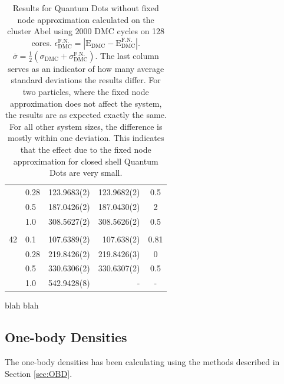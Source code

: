 \begin{table}
\begin{center}
\begin{tabular}{rl|rrc}
          &   0.28   & 123.9683(2) & 123.9682(2)& 0.5 \\
          &   0.5    & 187.0426(2) & 187.0430(2)& 2 \\
          &   1.0    & 308.5627(2) & 308.5626(2)& 0.5 \\
\cline{2-5}
\multicolumn{5}{c}{} \\
    42    &   0.1    & 107.6389(2) & 107.638(2) & 0.81 \\
          &   0.28   & 219.8426(2) & 219.8426(3)& 0 \\
          &   0.5    & 330.6306(2) & 330.6307(2)& 0.5 \\
          &   1.0    & 542.9428(8) &    -       & - \\
\hline\hline
\end{tabular}
\caption{Results for Quantum Dots without fixed node approximation calculated on the cluster Abel using $2000$ DMC cycles on 128 cores. $\epsilon_\mathrm{DMC}^\mathrm{F.N.} = |\mathrm{E_{DMC}} - \mathrm{E_{DMC}^{F.N.}}|$. $\overline{\sigma}  = \frac{1}{2}(\sigma_\mathrm{DMC} + \sigma_\mathrm{DMC}^\mathrm{F.N.})$. The last column serves as an indicator of how many average standard deviations the results differ. For two particles, where the fixed node approximation does not affect the system, the results are as expected exactly the same. For all other system sizes, the difference is mostly within one deviation. This indicates that the effect due to the fixed node approximation for closed shell Quantum Dots are very small.}
\end{center}
\end{table}

blah blah

\clearpage

\subsection{One-body Densities}

The one-body densities has been calculating using the methods described in Section \ref{sec:OBD}.


